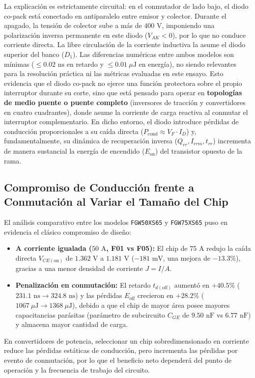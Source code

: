 \documentclass[11pt,a4paper]{article}
\begin{document}
La explicación es estrictamente circuital: en el conmutador de lado bajo, el diodo co-pack está conectado en antiparalelo entre emisor y colector. Durante el apagado, la tensión de colector sube a más de $400\text{ V}$, imponiendo una polarización inversa permanente en este diodo ($V_{AK} < 0$), por lo que no conduce corriente directa. La libre circulación de la corriente inductiva la asume el diodo superior del banco ($D_1$). Las diferencias numéricas entre ambos modelos son mínimas ($\le 0.02\text{ ns}$ en retardo y $\le 0.01\ \mu\text{J}$ en energía), no siendo relevantes para la resolución práctica ni las métricas evaluadas en este ensayo. Esto evidencia que el diodo co-pack no ejerce una función protectora sobre el propio interruptor durante su corte, sino que está pensado para operar en \textbf{topologías de medio puente o puente completo} (inversores de tracción y convertidores en cuatro cuadrantes), donde asume la corriente de carga reactiva al conmutar el interruptor complementario. En dicho entorno, el diodo introduce pérdidas de conducción proporcionales a su caída directa ($P_{\text{cond}} \approx V_F \cdot I_D$) y, fundamentalmente, su dinámica de recuperación inversa ($Q_{rr}, I_{rrm}, t_{rr}$) incrementa de manera sustancial la energía de encendido ($E_{\text{on}}$) del transistor opuesto de la rama.

\subsection{Compromiso de Conducción frente a Conmutación al Variar el Tamaño del Chip}
El análisis comparativo entre los modelos \texttt{FGW50XS65} y \texttt{FGW75XS65} puso en evidencia el clásico compromiso de diseño:
\begin{itemize}[leftmargin=*, noitemsep, topsep=2pt]
  \item \textbf{A corriente igualada ($50\text{ A}$, F01 vs F05):} El chip de 75 A redujo la caída directa $V_{CE(\text{on})}$ de $1.362\text{ V}$ a $1.181\text{ V}$ ($-181\text{ mV}$, una mejora de $-13.3\%$), gracias a una menor densidad de corriente $J = I/A$.
  \item \textbf{Penalización en conmutación:} El retardo $t_{d(\text{off})}$ aumentó en $+40.5\%$ ($231.1\text{ ns} \to 324.8\text{ ns}$) y las pérdidas $E_{\text{off}}$ crecieron en $+28.2\%$ ($1067\ \mu\text{J} \to 1368\ \mu\text{J}$), debido a que el chip de mayor área posee mayores capacitancias parásitas (parámetro de subcircuito $C_{GE}$ de $9.50\text{ nF}$ vs $6.77\text{ nF}$) y almacena mayor cantidad de carga.
\end{itemize}
En convertidores de potencia, seleccionar un chip sobredimensionado en corriente reduce las pérdidas estáticas de conducción, pero incrementa las pérdidas por evento de conmutación, por lo que el beneficio neto dependerá del punto de operación y la frecuencia de trabajo del circuito.
\end{document}
